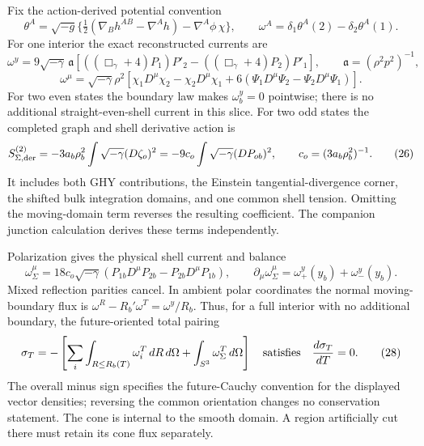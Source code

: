\documentclass[
  10pt,
]{article}
\begin{document}
Fix the action-derived potential convention \[
 \theta^A=\sqrt{-g}\{\tfrac12(\nabla_Bh^{AB}-\nabla^Ah)
                        -\nabla^A\phi\,\chi\},\qquad
 \omega^A=\delta_1\theta^A(2)-\delta_2\theta^A(1).
\] For one interior the exact reconstructed currents are \[
 \omega^y=9\sqrt{-\gamma}\,\mathfrak a
 [((\Box_\gamma+4)P_1)P'_2-((\Box_\gamma+4)P_2)P'_1],
 \qquad\mathfrak a=(\rho^2p^2)^{-1},
\] \[
 \omega^\mu=\sqrt{-\gamma}\rho^2
 [\chi_1D^\mu\chi_2-\chi_2D^\mu\chi_1
       +6(\Psi_1D^\mu\Psi_2-\Psi_2D^\mu\Psi_1)].          \tag{25}
\] For two even states the boundary law makes \(\omega^y_b=0\)
pointwise; there is no additional straight-even-shell current in this
slice. For two odd states the completed graph and shell derivative
action is \[
 S^{(2)}_{\Sigma,\rm der}
   =-3a_b\rho_b^2\int\sqrt{-\gamma}(D\zeta_o)^2
   =-9c_o\int\sqrt{-\gamma}(DP_{ob})^2,
 \qquad c_o=(3a_b\rho_b^2)^{-1}.                          \tag{26}
\] It includes both GHY contributions, the Einstein
tangential-divergence corner, the shifted bulk integration domains, and
one common shell tension. Omitting the moving-domain term reverses the
resulting coefficient. The companion junction calculation derives these
terms independently.

Polarization gives the physical shell current and balance \[
 \omega_\Sigma^\mu=18c_o\sqrt{-\gamma}
 (P_{1b}D^\mu P_{2b}-P_{2b}D^\mu P_{1b}),\qquad
 \partial_\mu\omega_\Sigma^\mu=\omega_+^y(y_b)+\omega_-^y(y_b). \tag{27}
\] Mixed reflection parities cancel. In ambient polar coordinates the
normal moving-boundary flux is \(\omega^R-R_b'\omega^T=\omega^y/R_b\).
Thus, for a full interior with no additional boundary, the
future-oriented total pairing \[
 \sigma_T=-\left[\sum_i\int_{R\le R_b(T)}\omega_i^T\,dR\,d\Omega
                     +\int_{S^3}\omega_\Sigma^T\,d\Omega\right]
 \quad\hbox{satisfies}\quad\frac{d\sigma_T}{dT}=0.          \tag{28}
\] The overall minus sign specifies the future-Cauchy convention for the
displayed vector densities; reversing the common orientation changes no
conservation statement. The cone is internal to the smooth domain. A
region artificially cut there must retain its cone flux separately.
\end{document}
